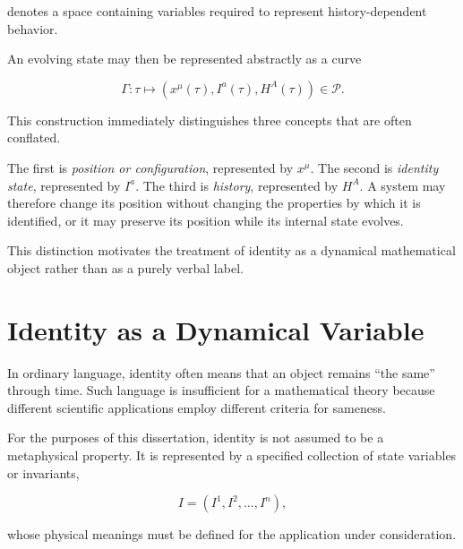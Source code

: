 \documentclass[12pt,oneside]{book}
\begin{document}
denotes a space containing variables required to represent
history-dependent behavior.

An evolving state may then be represented abstractly as a curve

\begin{equation}
    \Gamma:
    \tau
    \longmapsto
    \left(
        x^\mu(\tau),
        I^a(\tau),
        H^A(\tau)
    \right)
    \in
    \mathcal{P}.
    \label{eq:generalized-state-trajectory}
\end{equation}

This construction immediately distinguishes three concepts that
are often conflated.

The first is \emph{position or configuration}, represented by
\(x^\mu\). The second is \emph{identity state}, represented by
\(I^a\). The third is \emph{history}, represented by \(H^A\).
A system may therefore change its position without changing the
properties by which it is identified, or it may preserve its
position while its internal state evolves.

This distinction motivates the treatment of identity as a
dynamical mathematical object rather than as a purely verbal
label.


\section{Identity as a Dynamical Variable}
\label{sec:identity-dynamical-variable}

In ordinary language, identity often means that an object
remains ``the same'' through time. Such language is insufficient
for a mathematical theory because different scientific
applications employ different criteria for sameness.

For the purposes of this dissertation, identity is not assumed
to be a metaphysical property. It is represented by a specified
collection of state variables or invariants,

\begin{equation}
    I
    =
    \left(
        I^1,
        I^2,
        \ldots,
        I^n
    \right),
    \label{eq:identity-vector}
\end{equation}

whose physical meanings must be defined for the application
under consideration.
\end{document}
